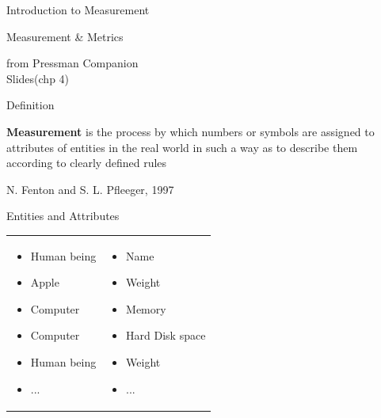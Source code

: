 \documentclass{beamer}
\begin{document}
\begin{frame}{\centerline{}}
\begin{center}
{\Large
Introduction to Measurement \\
}
\end{center}
\end{frame}


\begin{frame}{\centerline{Measurement \& Metrics
}}

\begin{small}
\begin{center}
from Pressman Companion \\Slides(chp 4)
\end{center}
\end{small}

\end{frame}

\begin{frame}{\centerline{Definition}}

\textbf{Measurement} is the process by which numbers or symbols are assigned to attributes of entities in the real world in such a way as to describe them according to clearly defined rules
\begin{flushright}
N. Fenton and S. L. Pfleeger, 1997
\end{flushright}

\end{frame}

\begin{frame}{\centerline{Entities and Attributes}}

\begin{table}[H]
\begin{tabulary}{\textwidth}{m{5.5cm} m{5.5cm}}
\begin{itemize}    
    \item Human being
    \item Apple
    \item Computer
    \item Computer
    \item Human being
    \item ...
\end{itemize} &
\begin{itemize}    
    \item Name
    \item Weight
    \item Memory
    \item Hard Disk space
    \item Weight
    \item ...
\end{itemize}
\end{tabulary}
\end{table}
\end{frame}
\end{document}
